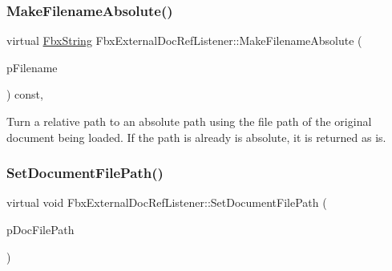 \mbox{\label{class_fbx_external_doc_ref_listener_a0ccdcffe94bdebb645b119cbb8b8e452}} 
\subsubsection{\texorpdfstring{Make\+Filename\+Absolute()}{MakeFilenameAbsolute()}}
{\footnotesize\ttfamily virtual \hyperlink{class_fbx_string}{Fbx\+String} Fbx\+External\+Doc\+Ref\+Listener\+::\+Make\+Filename\+Absolute (\begin{DoxyParamCaption}\item[{const \hyperlink{class_fbx_string}{Fbx\+String} \&}]{p\+Filename }\end{DoxyParamCaption}) const\hspace{0.3cm}{\ttfamily [protected]}, {\ttfamily [virtual]}}

Turn a relative path to an absolute path using the file path of the original document being loaded. If the path is already is absolute, it is returned as is. \mbox{\label{class_fbx_external_doc_ref_listener_aac019a58c4fda8ce675fb67edb340cbf}} 
\subsubsection{\texorpdfstring{Set\+Document\+File\+Path()}{SetDocumentFilePath()}}
{\footnotesize\ttfamily virtual void Fbx\+External\+Doc\+Ref\+Listener\+::\+Set\+Document\+File\+Path (\begin{DoxyParamCaption}\item[{const \hyperlink{class_fbx_string}{Fbx\+String} \&}]{p\+Doc\+File\+Path }\end{DoxyParamCaption})\hspace{0.3cm}{\ttfamily [virtual]}}

